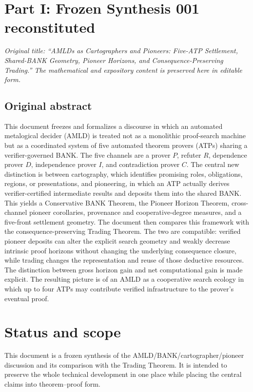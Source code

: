 \documentclass[11pt]{article}
\theoremstyle{remark}
\begin{document}
\tableofcontents
\newpage

\section*{Part I: Frozen Synthesis 001 reconstituted}
\textit{Original title: ``AMLDs as Cartographers and Pioneers: Five-ATP Settlement, Shared-BANK Geometry, Pioneer Horizons, and Consequence-Preserving Trading.'' The mathematical and expository content is preserved here in editable form.}

\subsection*{Original abstract}
This document freezes and formalizes a discourse in which an automated metalogical decider (AMLD) is treated not as a monolithic proof-search machine but as a coordinated system of five automated theorem provers (ATPs) sharing a verifier-governed BANK. The five channels are a prover $P$, refuter $R$, dependence prover $D$, independence prover $I$, and contradiction prover $C$. The central new distinction is between cartography, which identifies promising roles, obligations, regions, or presentations, and pioneering, in which an ATP actually derives verifier-certified intermediate results and deposits them into the shared BANK. This yields a Conservative BANK Theorem, the Pioneer Horizon Theorem, cross-channel pioneer corollaries, provenance and cooperative-degree measures, and a five-front settlement geometry. The document then compares this framework with the consequence-preserving Trading Theorem. The two are compatible: verified pioneer deposits can alter the explicit search geometry and weakly decrease intrinsic proof horizons without changing the underlying consequence closure, while trading changes the representation and reuse of those deductive resources. The distinction between gross horizon gain and net computational gain is made explicit. The resulting picture is of an AMLD as a cooperative search ecology in which up to four ATPs may contribute verified infrastructure to the prover's eventual proof.

\section{Status and scope}
This document is a frozen synthesis of the AMLD/BANK/cartographer/pioneer discussion and its comparison with the Trading Theorem. It is intended to preserve the whole technical development in one place while placing the central claims into theorem--proof form.
\end{document}
